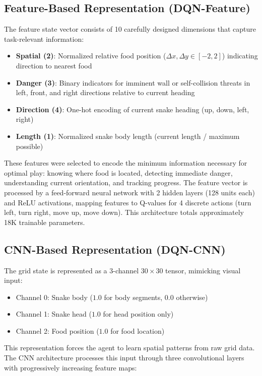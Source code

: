 \documentclass[10pt,a4paper,twocolumn]{article}
\begin{document}
\subsection{Feature-Based Representation (DQN-Feature)}

The feature state vector consists of 10 carefully designed dimensions that capture task-relevant information:
\begin{itemize}
    \item \textbf{Spatial (2)}: Normalized relative food position ($\Delta x, \Delta y \in [-2, 2]$) indicating direction to nearest food
    \item \textbf{Danger (3)}: Binary indicators for imminent wall or self-collision threats in left, front, and right directions relative to current heading
    \item \textbf{Direction (4)}: One-hot encoding of current snake heading (up, down, left, right)
    \item \textbf{Length (1)}: Normalized snake body length (current length / maximum possible)
\end{itemize}

These features were selected to encode the minimum information necessary for optimal play: knowing where food is located, detecting immediate danger, understanding current orientation, and tracking progress. The feature vector is processed by a feed-forward neural network with 2 hidden layers (128 units each) and ReLU activations, mapping features to Q-values for 4 discrete actions (turn left, turn right, move up, move down). This architecture totals approximately 18K trainable parameters.

\subsection{CNN-Based Representation (DQN-CNN)}

The grid state is represented as a 3-channel $30 \times 30$ tensor, mimicking visual input:
\begin{itemize}
    \item Channel 0: Snake body ($1.0$ for body segments, $0.0$ otherwise)
    \item Channel 1: Snake head ($1.0$ for head position only)
    \item Channel 2: Food position ($1.0$ for food location)
\end{itemize}

This representation forces the agent to learn spatial patterns from raw grid data. The CNN architecture processes this input through three convolutional layers with progressively increasing feature maps:
\end{document}
